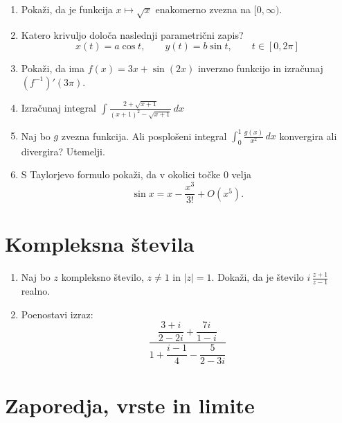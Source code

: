 \documentclass[a4paper,12pt]{article}
\begin{document}
\begin{enumerate}
\item
Pokaži, da je funkcija \(x \mapsto \sqrt{x}\) enakomerno zvezna na \([0,\infty)\).

\item
Katero krivuljo določa naslednji parametrični zapis?
\[
x(t) = a \cos t, \qquad %
y(t) = b \sin t, \qquad %
t \in [0, 2 \pi]
\]

\item
Pokaži, da ima \(f(x)=3x+\sin(2x)\) inverzno funkcijo in izračunaj \((f^{-1})\prime(3\pi)\).

\item
Izračunaj integral
\(\displaystyle\int \frac{2+\sqrt{x+1}}{(x+1)^2-\sqrt{x+1}}\,dx\)

\item
Naj bo \(g\) zvezna funkcija. Ali posplošeni integral
\(\int_0^1 \frac{g(x)}{x^2}\,dx\)
konvergira ali divergira? Utemelji.

\item
S Taylorjevo formulo pokaži, da v okolici točke \(0\) velja
\[\sin x=x-\frac{x^3}{3!}+O(x^5).\]
\end{enumerate}

\section*{Kompleksna števila}

\begin{enumerate}
\item
Naj bo \(z\) kompleksno število, \(z \ne 1\) in \(|z|=1\).
Dokaži, da je število \( i \, \frac{z+1}{z-1} \) realno.

\item
Poenostavi izraz:
\[\frac{\dfrac{3+i}{2-2i}+\dfrac{7i}{1-i}}{1+\dfrac{i-1}{4}-\dfrac{5}{2-3i}}\]
\end{enumerate}

\section*{Zaporedja, vrste in limite}
\end{document}
